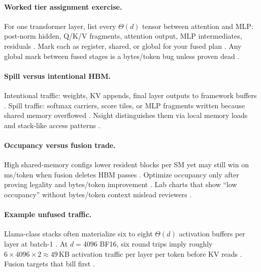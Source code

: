 \paragraph{Worked tier assignment exercise.}
For one transformer layer, list every $\Theta(d)$ tensor between attention and MLP: post-norm hidden, Q/K/V fragments, attention output, MLP intermediates, residuals \citep{dao2022flashattention,memoryfloor2026}.
Mark each as register, shared, or global for your fused plan \citep{yirage2026,chen2020compilerbasedhardw}.
Any global mark between fused stages is a bytes/token bug unless proven dead \citep{taxbreak2026,memoryfloor2026}.

\paragraph{Spill versus intentional HBM.}
Intentional traffic: weights, KV appends, final layer outputs to framework buffers \citep{kwon2023vllm,dlbook}.
Spill traffic: softmax carriers, score tiles, or MLP fragments written because shared memory overflowed \citep{memoryfloor2026,dao2022flashattention,patel2025llminference}.
Nsight distinguishes them via local memory loads and stack-like access patterns \citep{semianalysis2024tma}.

\paragraph{Occupancy versus fusion trade.}
High shared-memory configs lower resident blocks per SM yet may still win on ms/token when fusion deletes HBM passes \citep{memoryfloor2026,semianalysis2024tma,taxbreak2026}.
Optimize occupancy only after proving legality and bytes/token improvement \citep{yirage2026,patel2025llminference}.
Lab charts that show ``low occupancy'' without bytes/token context mislead reviewers \citep{memoryfloor2026}.

\paragraph{Example unfused traffic.}
Llama-class stacks often materialize six to eight $\Theta(d)$ activation buffers per layer at batch-1 \citep{taxbreak2026,dao2022flashattention,memoryfloor2026}.
At $d{=}4096$ BF16, six round trips imply roughly $6 \times 4096 \times 2 \approx 49$\,KB activation traffic per layer per token before KV reads \citep{kwon2023vllm,memoryfloor2026}.
Fusion targets that bill first \citep{chen2020compilerbasedhardw,yirage2026}.

